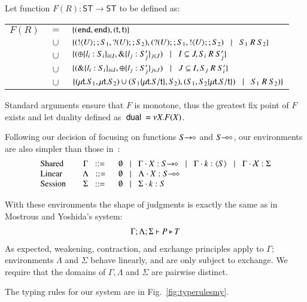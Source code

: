 \begin{definition}[Duality]
	Let function $F(R): \mathsf{ST} \longrightarrow \mathsf{ST}$ to be defined as:

	\begin{tabular}{rcl}
		$F(R)$ &$=$&		$\{(\mathtt{end}, \mathtt{end}), (\mathsf{t}, \mathsf{t})\}$\\
			&$\cup$&	$\{(! \langle U \rangle ;;S_1, ? (U) ;; S_2), (? (U) ;;S_1, ! \langle U \rangle ;; S_2) \;\;\;|\;\;\; S_1\ R\ S_2\}$\\
			&$\cup$&	$\{(\oplus \{l_i: S_i\}_{i \in I}, \& \{l_j: S_j'\}_{j \in J}) \;\;\;|\;\;\; I \subseteq J, S_i\ R\ S_j'\}$\\
			&$\cup$&	$\{(\& \{l_i: S_i\}_{i \in I}, \oplus \{l_j: S_j'\}_{j \in J}) \;\;\;|\;\;\; J \subseteq I, S_j\ R\ S_i'\}$\\
			&$\cup$&	$\{(\mu\mathsf{t}.S_1, \mu\mathsf{t}.S_2) \cup (S_1 \{\mu\mathsf{t}.S/\mathsf{t} \}, S_2), (S_1, S_2\{\mu\mathsf{t}.S/\mathsf{t} \}) \;\;\;|\;\;\; S_1\ R\ S_2)\}$
	\end{tabular}

	Standard arguments ensure that $F$ is monotone, thus the greatest fix point
	of $F$ exists and let duality defined as $\ \mathsf{dual}\  = \nu X. F(X)$.
\end{definition}


Following our decision of focusing on functions $S\!\! \rightarrow\!\! \diamond$ and $S\!\! \multimap\!\! \diamond$,
our environments are also simpler than those in~\cite{tlca07}:
\[
	\begin{array}{lcl}
		\text{Shared} & \Gamma \bnfis & \emptyset \bnfbar \Gamma \cat \varp{X}: \shot{S} \bnfbar \Gamma \cat k: \chtype{S} \bnfbar \Gamma \cat \rvar{X}: \Sigma \\
		\text{Linear} & \Lambda \bnfis & \emptyset \bnfbar \Lambda \cat \varp{X}: \lhot{S}  \\
		\text{Session} \quad & \Sigma \bnfis & \emptyset \bnfbar \Sigma \cat k:S  
	\end{array}
\]


With these environments the shape of judgments is exactly the same as in Mostrous and Yoshida's system:
\[
	\begin{array}{c}
		\Gamma; \Lambda ; \Sigma \vdash P \triangleright T
	\end{array}
\]
As expected, weakening, contraction, and exchange principles apply to $\Gamma$;
environments $\Lambda$ and $\Sigma$ behave linearly, and are only subject to exchange.
We require that the domains of $\Gamma, \Lambda$ and $\Sigma$ are pairwise distinct.
\newcommand{\jrule}[3]{\displaystyle \trule{#3}~~\frac{#1 }{#2}}
\newcommand{\addenv}{\circ}




The typing rules for our system are in Fig.~\ref{fig:typerulesmy}. 
